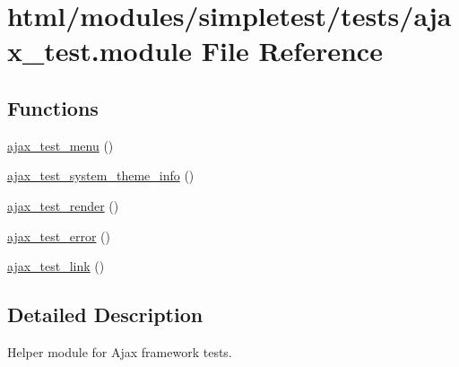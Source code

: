 \hypertarget{ajax__test_8module}{
\section{html/modules/simpletest/tests/ajax\_\-test.module File Reference}
\label{ajax__test_8module}
}
\subsection*{Functions}
\begin{DoxyCompactItemize}
\item 
\hyperlink{ajax__test_8module_a66ae95385470f8f931d2889fcf741683}{ajax\_\-test\_\-menu} ()
\item 
\hyperlink{ajax__test_8module_ac0eabc02178682aebab6342ed3c93933}{ajax\_\-test\_\-system\_\-theme\_\-info} ()
\item 
\hyperlink{ajax__test_8module_a9fb31d7b9cb56d274b778a8a8c0fa925}{ajax\_\-test\_\-render} ()
\item 
\hyperlink{ajax__test_8module_aa58a78423b7574f07be000292f81674c}{ajax\_\-test\_\-error} ()
\item 
\hyperlink{ajax__test_8module_a43d54162adad14aeab868fdd2ff797e2}{ajax\_\-test\_\-link} ()
\end{DoxyCompactItemize}


\subsection{Detailed Description}
Helper module for Ajax framework tests. 


